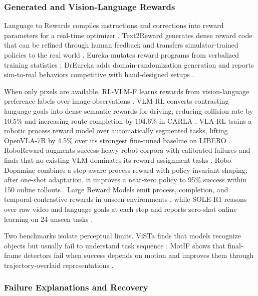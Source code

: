 \subsubsection{Generated and Vision-Language Rewards}
\label{supp:embodied-rewards}

Language to Rewards compiles instructions and corrections into reward parameters for a real-time optimizer \citep{yu2023language}. Text2Reward generates dense reward code that can be refined through human feedback and transfers simulator-trained policies to the real world \citep{xie2024text2reward}. Eureka mutates reward programs from verbalized training statistics \citep{ma2024eureka}; DrEureka adds domain-randomization generation and reports sim-to-real behaviors competitive with hand-designed setups \citep{ma2024dreureka}.

When only pixels are available, RL-VLM-F learns rewards from vision-language preference labels over image observations \citep{wang2024rlvlmf}. VLM-RL converts contrasting language goals into dense semantic rewards for driving, reducing collision rate by 10.5\% and increasing route completion by 104.6\% in CARLA \citep{huang2024vlmrl}. VLA-RL trains a robotic process reward model over automatically segmented tasks, lifting OpenVLA-7B by 4.5\% over its strongest fine-tuned baseline on LIBERO \citep{lu2025vlarl}. RoboReward augments success-heavy robot corpora with calibrated failures and finds that no existing VLM dominates its reward-assignment tasks \citep{lee2026roboreward}. Robo-Dopamine combines a step-aware process reward with policy-invariant shaping; after one-shot adaptation, it improves a near-zero policy to 95\% success within 150 online rollouts \citep{tan2025robodopamine}. Large Reward Models emit process, completion, and temporal-contrastive rewards in unseen environments \citep{wu2026large}, while SOLE-R1 reasons over raw video and language goals at each step and reports zero-shot online learning on 24 unseen tasks \citep{schroeder2026soler1}.

Two benchmarks isolate perceptual limits. ViSTa finds that models recognize objects but usually fail to understand task sequence \citep{wybitul2024vista}; MotIF shows that final-frame detectors fail when success depends on motion and improves them through trajectory-overlaid representations \citep{hwang2024motif}.

\subsubsection{Failure Explanations and Recovery}
\label{supp:embodied-failure-recovery}

